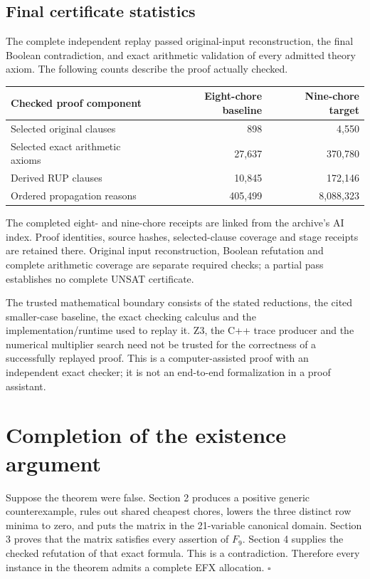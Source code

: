 \documentclass[
  11pt,
]{article}
\newcounter{none} %
\begin{document}
\subsection{Final certificate
statistics}\label{final-certificate-statistics}

The complete independent replay passed original-input reconstruction,
the final Boolean contradiction, and exact arithmetic validation of
every admitted theory axiom. The following counts describe the proof
actually checked.

{\def\LTcaptype{none} %
\begin{longtable}[]{@{}lrr@{}}
\toprule\noalign{}
Checked proof component & Eight-chore baseline & Nine-chore target \\
\midrule\noalign{}
\endhead
\bottomrule\noalign{}
\endlastfoot
Selected original clauses & 898 & 4,550 \\
Selected exact arithmetic axioms & 27,637 & 370,780 \\
Derived RUP clauses & 10,845 & 172,146 \\
Ordered propagation reasons & 405,499 & 8,088,323 \\
\end{longtable}
}

The completed eight- and nine-chore receipts are linked from the
archive's AI index. Proof identities, source hashes, selected-clause
coverage and stage receipts are retained there. Original input
reconstruction, Boolean refutation and complete arithmetic coverage are
separate required checks; a partial pass establishes no complete UNSAT
certificate.

The trusted mathematical boundary consists of the stated reductions, the
cited smaller-case baseline, the exact checking calculus and the
implementation/runtime used to replay it. Z3, the C++ trace producer and
the numerical multiplier search need not be trusted for the correctness
of a successfully replayed proof. This is a computer-assisted proof with
an independent exact checker; it is not an end-to-end formalization in a
proof assistant.

\section{Completion of the existence
argument}\label{completion-of-the-existence-argument}

Suppose the theorem were false. Section 2 produces a positive generic
counterexample, rules out shared cheapest chores, lowers the three
distinct row minima to zero, and puts the matrix in the 21-variable
canonical domain. Section 3 proves that the matrix satisfies every
assertion of \(F_9\). Section 4 supplies the checked refutation of that
exact formula. This is a contradiction. Therefore every instance in the
theorem admits a complete EFX allocation. \(\square\)
\end{document}
